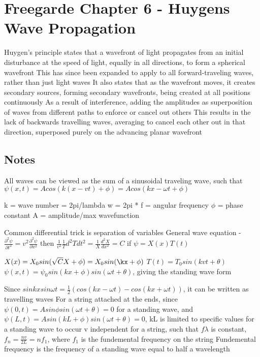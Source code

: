 \documentclass[11 pt, twoside]{article}
\newenvironment{outline*}
{
	\begin{outline}[enumerate]
	}
	{\end{outline}
}
\begin{document}
\section{Freegarde Chapter 6 - Huygens Wave Propagation}
\begin{outline*}
\1 Huygen's principle states that a wavefront of light propagates from an initial disturbance at the speed of light, equally in all directions, to form a spherical wavefront
\2 This has since been expanded to apply to all forward-traveling waves, rather than just light waves
\2 It also states that as the wavefront moves, it creates secondary sources, forming secondary wavefronts, being created at all positions continuously
\2 As a result of interference, adding the amplitudes as superposition of waves from different paths to enforce or cancel out others
\3 This results in the lack of backwards travelling waves, averaging to cancel each other out in that direction, superposed purely on the advancing planar wavefront
\end{outline*}
\subsection{Notes}
All waves can be viewed as the sum of a sinusoidal traveling wave, such that $\psi(x, t) = Acos(k(x-vt) + \phi) = Acos(kx - \omega t + \phi)$

k = wave number = 2pi/lambda
w = 2pi * f = angular frequency
$\phi$ = phase constant
A = amplitude/max wavefunction

Common differential trick is separation of variables
General wave equation - 
$\frac{\partial^2 \psi}{\partial t^2} = v^2\frac{\partial^2 \psi}{\partial x^2}$ then $\frac{1}{v^2}\frac{1}{T}{d^2T}{dt^2} = \frac{1}{X}\frac{d^2X}{dx^2} = C$ if $\psi = X(x)T(t)$

$X(x) = X_0 sin(\sqrt{C}X + \phi) = X_0sin(\kx + \phi)$
$T(t) = T_0 sin(kvt +  \theta)$
$\psi(x, t) = \psi_0 sin(kx + \phi) sin(\omega t + \theta)$, giving the standing wave form

Since $sinkxsin\omega t = \frac{1}{2}(cos(kx - \omega t) - cos(kx + \omega t))$, it can be written as travelling waves
For a string attached at the ends, since $\psi(0, t) = Asin\phi sin(\omega t + \theta) = 0$ for a standing wave, and $\psi(L, t) = Asin(kL + \phi)sin(\omega t + \theta) = 0$, kL is limited to specific values for a standing wave to occur
v independent for a string, such that $f\lambda$ is constant, $f_n = \frac{nv}{2L} = nf_1$, where $f_1$ is the fundemental frequency on the string
Fundemental frequency is the frequency of a standing wave equal to half a wavelength
\end{document}
